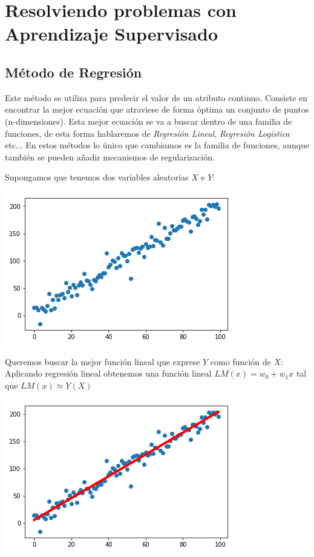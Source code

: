 \section{Resolviendo problemas con Aprendizaje Supervisado}
\subsection{Método de Regresión}
Este  método  se  utiliza  para  predecir  el  valor  de  un  atributo  continuo.  Consiste  en encontrar la mejor ecuación que atraviese de forma óptima un conjunto de puntos (n-dimensiones).  
Esta mejor ecuación se va a buscar dentro de una familia de funciones, de esta forma hablaremos de \textit{Regresión Lineal}, \textit{Regresión Logistica} etc...  
En estos métodos lo único que cambiamos es la familia de funciones, aunque también se pueden añadir mecanismos de regularización.


Supongamos que tenemos dos variables aleatorias $X$ e $Y$:
\begin{center}
\includegraphics[scale=0.7]{./img/reg_lin_data.png}
\end{center}
Queremos buscar la mejor función lineal que exprese $Y$ como función de $X$:  
Aplicando regresión lineal obtenemos una función lineal $LM(x) = w_0 + w_1x$ tal que $LM(x) \simeq  Y(X)$ 
\begin{center}
\includegraphics[scale=0.7]{./img/reg_lin_fit.png}
\end{center}

